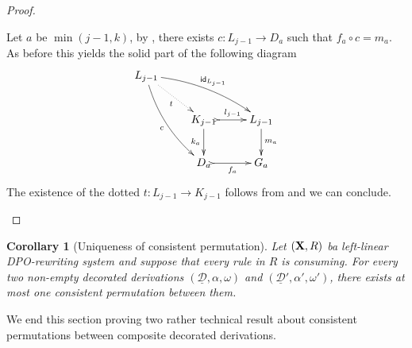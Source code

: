 \documentclass[a4paper]{article}
\newcommand{\id}[1]{\mathsf{id}_{#1}}
\def\X{\textbf {\textup{X}}}
\newcommand{\dder}[1]{\mathscr{#1}}
\newcommand{\der}[1]{\underline{\dder{#1}}}
\newtheorem{corollary}[theorem]{Corollary}
\theoremstyle{definition}
\begin{document}
\begin{proof}
\begin{enumerate}
			Let $a$ be $\min(j-1, k)$, by ,  there exists $c\colon L_{j-1}\to D_a$ such that $f_a\circ c=m_a$. As before this yields the solid part of the following diagram
			\[\xymatrix{L_{j-1} \ar@/^.3cm/[drr]^{\id{L_{j-1}}} \ar@{.>}[dr]_{t} \ar@/_.3cm/[ddr]_{c}\\ & K_{j-1} \ar[d]_{k_a}\ar@{>->}[r]^{l_{j-1}}& L_{j-1} \ar[d]^{m_a} \\& D_a \ar@{>->}[r]_{f_a} & G_a} \]
			The existence of the dotted $t\colon L_{j-1}\to K_{j-1}$ follows from   and we can conclude. \qedhere
	\end{enumerate}
\end{proof}

\begin{corollary}[Uniqueness of consistent permutation]\label{cor:unique}
Let $(\X,R)$ ba left-linear DPO-rewriting system and suppose that every rule in $R$ is consuming. For every two non-empty decorated derivations $(\der{D}, \alpha, \omega)$ and $(\der{D}', \alpha', \omega')$, there exists at most one consistent permutation between them.
\end{corollary}

We end this section proving two rather technical result about consistent permutations between composite decorated derivations.
\end{document}
